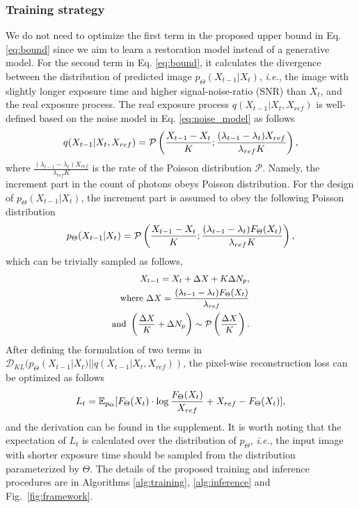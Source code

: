 \documentclass[10pt,twocolumn,letterpaper]{article}
\def\ie{\textit{i.e.}}
\newcommand{\D}[2]{\mathcal{D}_{KL}(#1||#2)}
\newcommand{\E}[2]{\mathbb{E}_{#1}[#2]}
\def\p{p_\Theta}
\def\P{\mathcal{P}}
\def\F{F_{\Theta}}
\begin{document}
\subsubsection{Training strategy}
We do not need to optimize the first term in the proposed upper bound in Eq. \ref{eq:bound} since we aim to learn a restoration model instead of a generative model.
For the second term in Eq. \ref{eq:bound}, it calculates the divergence between the distribution of predicted image $p_{\Theta}(X_{t-1}|X_{t})$, \ie, the image with slightly longer exposure time and higher signal-noise-ratio (SNR) than $X_{t}$, and the real exposure process. The real exposure process $q(X_{t-1}|X_t,X_{ref})$ is well-defined based on the noise model in Eq. \ref{eq:noise_model} as follows
\begin{equation}
\small
    q(X_{t-1}|X_t,X_{ref}) = \P \left( \frac{X_{t-1}-X_{t}}{K};\frac{(\lambda_{t-1}-\lambda_{t})X_{ref}}{\lambda_{ref}K}\right) ,
\end{equation}
where $\frac{(\lambda_{t-1}-\lambda_{t})X_{ref}}{\lambda_{ref}K}$ is the rate of the Poisson distribution $\P$. Namely, the increment part in the count of photons obeys Poisson distribution. For the design of $\p(X_{t-1}|X_{t})$, the increment part is assumed to obey the following Poisson distribution
\begin{equation}
\small
    \p(X_{t-1}|X_t) = \P \left(\frac{X_{t-1}-X_{t}}{K};\frac{(\lambda_{t-1}-\lambda_{t})\F(X_t)}{\lambda_{ref}K}\right),
\end{equation}
which can be trivially sampled as follows,
\begin{equation}
\small
\begin{split}
    X_{t-1} = X_t + \Delta X + K \Delta N_p, \\
    \text{where } \Delta X= \frac{(\lambda_{t-1}-\lambda_t) \F(X_t)}{\lambda_{ref}} \\
    \text{and } \left(\frac{\Delta X}{K} + \Delta N_p \right) \sim \mathcal{P}\left(\frac{\Delta X}{K}\right).
\end{split}
\label{eq:sampling}
\end{equation}
After defining the formulation of two terms in $\D{\p(X_{t-1}|X_{t})}{q(X_{t-1}|X_t,X_{ref})}$, the pixel-wise reconstruction loss can be optimized as follows
\begin{equation}
\small
    L_t =\E{\p}{\F(X_t) \cdot \log \frac{\F(X_t)}{ X_{ref}}+X_{ref}-\F(X_t)},
\label{eq:lt}
\end{equation}
and the derivation can be found in the supplement. It is worth noting that the expectation of $L_t$ is calculated over the distribution of $\p$, \ie, the input image with shorter exposure time should be sampled from the distribution parameterized by $\Theta$. The details of the proposed training and inference procedures are in Algorithms \ref{alg:training}, \ref{alg:inference} and Fig.~\ref{fig:framework}.
\end{document}

